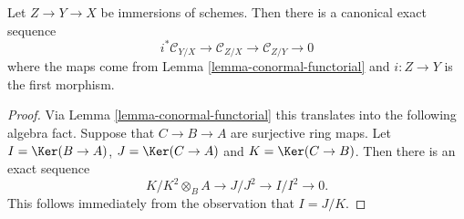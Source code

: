 \begin{lemma}
\label{lemma-transitivity-conormal}
Let $Z \to Y \to X$ be immersions of schemes. Then there is a canonical
exact sequence
$$
i^*\mathcal{C}_{Y/X} \to
\mathcal{C}_{Z/X} \to
\mathcal{C}_{Z/Y} \to 0
$$
where the maps come from
Lemma \ref{lemma-conormal-functorial}
and $i : Z \to Y$ is the first morphism.
\end{lemma}

\begin{proof}
Via
Lemma \ref{lemma-conormal-functorial}
this translates into the following algebra fact. Suppose that
$C \to B \to A$ are surjective ring maps. Let $I = \Ker(B \to A)$,
$J = \Ker(C \to A)$ and $K = \Ker(C \to B)$. Then
there is an exact sequence
$$
K/K^2 \otimes_B A \to J/J^2 \to I/I^2 \to 0.
$$
This follows immediately from the observation that $I = J/K$.
\end{proof}










